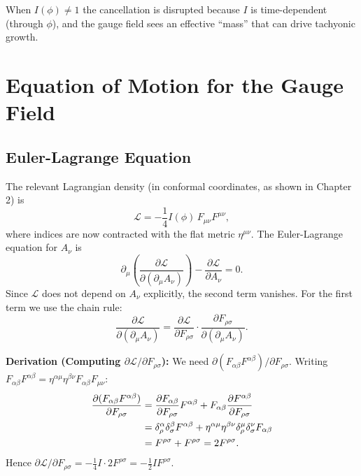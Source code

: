 \documentclass[12pt,a4paper,openany]{book}
\newcommand{\Fmn}{F_{\mu\nu}}
\begin{document}
When $I(\phi) \neq 1$ the cancellation is disrupted because $I$ is time-dependent (through $\phi$), and the gauge field sees an effective ``mass'' that can drive tachyonic growth.

\chapter{Equation of Motion for the Gauge Field}

\section{Euler-Lagrange Equation}

The relevant Lagrangian density (in conformal coordinates, as shown in Chapter 2) is
\begin{equation}
  \mathcal{L} = -\frac{1}{4}I(\phi)\,\Fmn F^{\mu\nu},
\end{equation}
where indices are now contracted with the flat metric $\eta^{\mu\nu}$. The Euler-Lagrange equation for $A_\nu$ is
\begin{equation}
  \partial_\mu\!\left(\frac{\partial\mathcal{L}}{\partial(\partial_\mu A_\nu)}\right) - \frac{\partial\mathcal{L}}{\partial A_\nu} = 0.
\end{equation}
Since $\mathcal{L}$ does not depend on $A_\nu$ explicitly, the second term vanishes. For the first term we use the chain rule:
\begin{equation}
  \frac{\partial\mathcal{L}}{\partial(\partial_\mu A_\nu)} = \frac{\partial\mathcal{L}}{\partial F_{\rho\sigma}}\cdot\frac{\partial F_{\rho\sigma}}{\partial(\partial_\mu A_\nu)}.
\end{equation}

\noindent\textbf{Derivation (Computing $\partial\mathcal{L}/\partial F_{\rho\sigma}$):} We need $\partial(F_{\alpha\beta}F^{\alpha\beta})/\partial F_{\rho\sigma}$. Writing $F_{\alpha\beta}F^{\alpha\beta} = \eta^{\alpha\mu}\eta^{\beta\nu}F_{\alpha\beta}F_{\mu\nu}$:
\begin{align}
  \frac{\partial(F_{\alpha\beta}F^{\alpha\beta})}{\partial F_{\rho\sigma}}
    &= \frac{\partial F_{\alpha\beta}}{\partial F_{\rho\sigma}}F^{\alpha\beta} + F_{\alpha\beta}\frac{\partial F^{\alpha\beta}}{\partial F_{\rho\sigma}} \notag\\
    &= \delta^\alpha_\rho\delta^\beta_\sigma F^{\alpha\beta} + \eta^{\alpha\mu}\eta^{\beta\nu}\delta^\mu_\rho\delta^\nu_\sigma F_{\alpha\beta} \notag\\
    &= F^{\rho\sigma} + F^{\rho\sigma} = 2F^{\rho\sigma}.
\end{align}
Hence $\partial\mathcal{L}/\partial F_{\rho\sigma} = -\tfrac{1}{4}I\cdot 2F^{\rho\sigma} = -\tfrac{1}{2}IF^{\rho\sigma}$.
\end{document}
